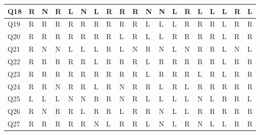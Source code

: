 \documentclass[]{article}
\begin{document}
\begin{table}[htb]
\begin{tabular}{|l|l|l|l|l|l|l|l|l|l|l|l|l|l|l|l|l|l|l|}
Q18 & R  & N & R  & L  & N & L  & R & R  & R  & N & N & L & R  & L  & L & L & R  & L \\ \hline
Q19 & R  & R  & R  & R  & R  & R  & R & R  & R  & L  & L  & L & R  & R  & R & L & R  & R \\ \hline
Q20 & R  & R  & R  & R  & R  & R  & R & L  & R  & L  & L  & R & R  & R  & R & L & R  & R \\ \hline
Q21 & R  & N & N & L  & L  & L  & R & L  & N & R  & N & L & N & R  & R & L & N & L \\ \hline
Q22 & R  & R  & R  & R  & R  & L  & R & R  & R  & L  & R  & R & R  & R  & R & L & R  & R \\ \hline
Q23 & R  & R  & R  & R  & R  & R  & R & R  & R  & L  & R  & R & R  & L  & R & L & R  & R \\ \hline
Q24 & R  & R  & N & R  & R  & L  & R & N & R  & R  & L  & R & L  & R  & R & R & R  & R \\ \hline
Q25 & L  & L  & L  & N & N & R  & R & N & R  & L  & L  & L & L  & N & L & R & R  & L \\ \hline
Q26 & R  & N & R  & R  & L  & R  & R & L  & R  & R  & N & L & L  & R  & R & R & R  & R \\ \hline
Q27 & R  & R  & R  & R  & R  & N & L & R  & R  & L  & N & L & R  & N & L & L & R  & R \\ \hline
\end{tabular}
\end{table}
\end{document}
